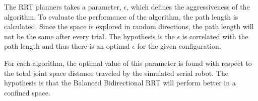 The RRT planners takes a parameter, \(\epsilon\), which defines the aggressiveness of the algorithm.
To evaluate the performance of the algorithm, the path length is calculated.
Since the space is explored in random directions, the path length will not be the same after every trial.
The hypothesis is the \(\epsilon\) is correlated with the path length and thus there is an optimal \(\epsilon\) for the given configuration.

For each algorithm, the optimal value of this parameter is found with respect to the total joint space distance traveled by the simulated serial robot.
The hypothesis is that the Balanced Bidirectional RRT will perform better in a confined space. %